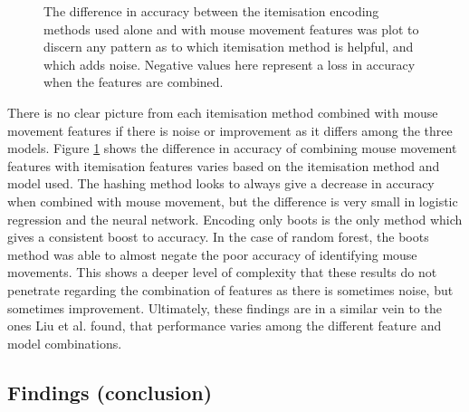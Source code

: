 \documentclass[Report.tex]{subfiles}
\begin{document}
\newcommand{\diffbarplot}[5]{
\addplot+[bar shift={#5}] coordinates { (Logistic Regression, #1) (Random Forest, #2) (Multi-layer Perceptron, #3) };
\addlegendentry{#4}
}
\makeatletter
\newcommand\resetstackedplots{
\makeatletter
\pgfplots@stacked@isfirstplottrue
\makeatother
\addplot [forget plot,draw=none] coordinates{(Logistic Regression,0) (Random Forest,0) (Multi-layer Perceptron,0)};
}
\makeatother
\begin{figure}[H]
\caption{The difference in accuracy between the itemisation encoding methods used alone and with mouse movement features was plot to discern any pattern as to which itemisation method is helpful, and which adds noise. Negative values here represent a loss in accuracy when the features are combined.}
\label{fig:itemisation-mouse-diff}
\end{figure}

There is no clear picture from each itemisation method combined with mouse movement features if there is noise or improvement as it differs among the three models. Figure \ref{fig:itemisation-mouse-diff} shows the difference in accuracy of combining mouse movement features with itemisation features varies based on the itemisation method and model used. The hashing method looks to always give a decrease in accuracy when combined with mouse movement, but the difference is very small in logistic regression and the neural network. Encoding only boots is the only method which gives a consistent boost to accuracy. In the case of random forest, the boots method was able to almost negate the poor accuracy of identifying mouse movements. This shows a deeper level of complexity that these results do not penetrate regarding the combination of features as there is sometimes noise, but sometimes improvement. Ultimately, these findings are in a similar vein to the ones Liu et al. \cite{starcraft-identification} found, that performance varies among the different feature and model combinations. 



\subsection{Findings (conclusion)}
\end{document}
